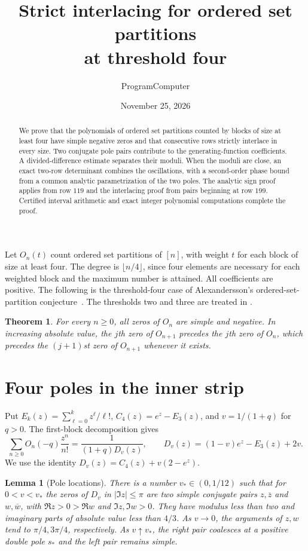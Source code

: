 \documentclass[11pt]{article}
\title{Strict interlacing for ordered set partitions\\ at threshold four}
\author{ProgramComputer}
\date{November 25, 2026}
\newtheorem{theorem}{Theorem}
\newtheorem{lemma}{Lemma}
\begin{document}
\maketitle

\begin{abstract}
We prove that the polynomials of ordered set partitions counted by blocks of size at least four have simple negative zeros and that consecutive rows strictly interlace in every size. Two conjugate pole pairs contribute to the generating-function coefficients. A divided-difference estimate separates their moduli. When the moduli are close, an exact two-row determinant combines the oscillations, with a second-order phase bound from a common analytic parametrization of the two poles. The analytic sign proof applies from row \(119\) and the interlacing proof from pairs beginning at row \(199\). Certified interval arithmetic and exact integer polynomial computations complete the proof.
\end{abstract}

Let \(O_n(t)\) count ordered set partitions of \([n]\), with weight \(t\) for each block of size at least four. The degree is \(\lfloor n/4\rfloor\), since four elements are necessary for each weighted block and the maximum number is attained. All coefficients are positive. The following is the threshold-four case of Alexandersson's ordered-set-partition conjecture~\cite{original}. The thresholds two and three are treated in \cite{two,three}.

\begin{theorem}\label{thm:main}
For every \(n\ge0\), all zeros of \(O_n\) are simple and negative. In increasing absolute value, the \(j\)th zero of \(O_{n+1}\) precedes the \(j\)th zero of \(O_n\), which precedes the \((j+1)\)st zero of \(O_{n+1}\) whenever it exists.
\end{theorem}

\section{Four poles in the inner strip}

Put \(E_k(z)=\sum_{\ell=0}^k z^\ell/\ell!\), \(C_4(z)=e^z-E_3(z)\), and \(v=1/(1+q)\) for \(q>0\). The first-block decomposition gives
\[
\sum_{n\ge0} O_n(-q)\frac{z^n}{n!}=\frac{1}{(1+q)D_v(z)},\qquad
D_v(z)=(1-v)e^z-E_3(z)+2v.
\]
We use the identity \(D_v(z)=C_4(z)+v(2-e^z)\).

\begin{lemma}[Pole locations]\label{lem:poles}
There is a number \(v_*\in(0,1/12)\) such that for \(0<v<v_*\) the zeros of \(D_v\) in \(|\Im z|\le\pi\) are two simple conjugate pairs \(z,\overline z\) and \(w,\overline w\), with \(\Re z>0>\Re w\) and \(\Im z,\Im w>0\). They have modulus less than two and imaginary parts of absolute value less than \(4/3\). As \(v\to0\), the arguments of \(z,w\) tend to \(\pi/4,3\pi/4\), respectively. As \(v\uparrow v_*\), the right pair coalesces at a positive double pole \(s_*\) and the left pair remains simple.
\end{lemma}
\end{document}
